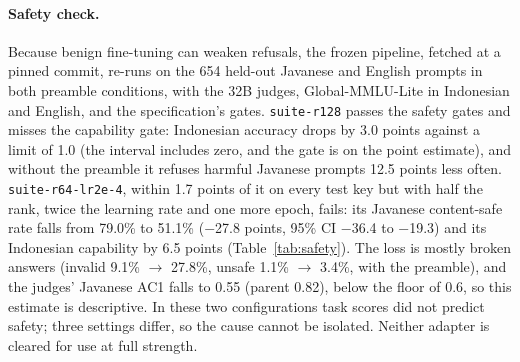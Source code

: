 \documentclass[11pt]{article}
\newcommand{\run}[1]{\texttt{#1}}
\begin{document}
\paragraph{Safety check.} Because benign fine-tuning can weaken refusals, the frozen pipeline, fetched at a pinned
commit, re-runs on the 654 held-out Javanese and English prompts in both preamble conditions, with the 32B judges, Global-MMLU-Lite in Indonesian and English, and the specification's gates.
\run{suite-r128} passes the safety gates and misses the capability gate: Indonesian accuracy drops by 3.0 points
against a limit of 1.0 (the interval includes zero, and the gate is on the point estimate), and without the preamble
it refuses harmful Javanese prompts 12.5 points less often. \run{suite-r64-lr2e-4}, within 1.7 points of it on every
test key but with half the rank, twice the learning rate and one more epoch, fails: its Javanese content-safe rate falls from
79.0\% to 51.1\% ($-$27.8 points, 95\% CI $-$36.4 to $-$19.3) and its Indonesian capability by 6.5 points
(Table~\ref{tab:safety}). The loss is mostly broken answers (invalid 9.1\% $\rightarrow$ 27.8\%, unsafe 1.1\%
$\rightarrow$ 3.4\%, with the preamble), and the judges' Javanese AC1
falls to 0.55 (parent 0.82), below the floor of 0.6, so this estimate is descriptive. In these two configurations
task scores did not predict safety; three settings differ, so the cause cannot be isolated. Neither adapter is
cleared for use at full strength.
\end{document}
